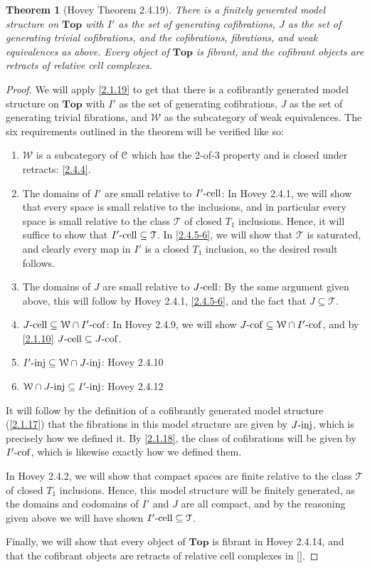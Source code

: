 \documentclass{amsart}
\theoremstyle{plain}
\newtheorem{theorem}{Theorem}[section]
\theoremstyle{definition}
\newcommand{\Top}{\mbf{Top}}
\newcommand{\sseq}{\subseteq}
\newcommand{\0}{\mathbf{0}}
\newcommand{\cC}{\mathcal C}
\newcommand{\cT}{\mathcal T}
\newcommand{\cW}{\mathcal W}
\newcommand{\mbf}[1]{\mathbf{#1}}
\renewcommand{\(}{\left(}
\renewcommand{\)}{\right)}
\def\scr{\EuScript}
\def\cC{\scr{C}}
\newcommand{\inj}{\text-\mathrm{inj}}
\newcommand{\cell}{\text-\mathrm{cell}}
\newcommand{\cof}{\text-\mathrm{cof}}
\begin{document}
\begin{theorem}[Hovey Theorem 2.4.19]\label{2.4.19}
  There is a finitely generated model structure on $\Top$ with $I'$ as the set of generating cofibrations, $J$ as the set of generating trivial cofibrations, and the cofibrations, fibrations, and weak equivalences as above. Every object of $\Top$ is fibrant, and the cofibrant objects are retracts of relative cell complexes.
\end{theorem}
\begin{proof}
  We will apply \autoref{2.1.19} to get that there is a cofibrantly generated model structure on $\Top$ with $I'$ as the set of generating cofibrations, $J$ as the set of generating trivial fibrations, and $\cW$ as the subcategory of weak equivalences. The six requirements outlined in the theorem will be verified like so:
  \begin{enumerate}[label=\arabic*.,noitemsep,topsep=0pt]
    \item $\cW$ is a subcategory of $\cC$ which has the 2-of-3 property and is closed under retracts: \autoref{2.4.4}.
    \item The domains of $I'$ are small relative to $I'\cell$: In {\color{red}Hovey 2.4.1}, we will show that every space is small relative to the inclusions, and in particular every space is small relative to the class $\cT$ of closed $T_1$ inclusions. Hence, it will suffice to show that $I'\cell\sseq\cT$. In \autoref{2.4.5-6}, we will show that $\cT$ is saturated, and clearly every map in $I'$ is a closed $T_1$ inclusion, so the desired result follows.
    \item The domains of $J$ are small relative to $J\cell$: By the same argument given above, this will follow by {\color{red}Hovey 2.4.1}, \autoref{2.4.5-6}, and the fact that $J\sseq\cT$.
    \item $J\cell\sseq\cW\cap I'\cof$: In {\color{red}Hovey 2.4.9}, we will show $J\cof\sseq\cW\cap I'\cof$, and by \autoref{2.1.10} $J\cell\sseq J\cof$.
    \item $I'\inj\sseq\cW\cap J\inj$: {\color{red}Hovey 2.4.10}
    \item $\cW\cap J\inj\sseq I'\inj$: {\color{red}Hovey 2.4.12}
  \end{enumerate}
  It will follow by the definition of a cofibrantly generated model structure (\autoref{2.1.17}) that the fibrations in this model structure are given by $J\inj$, which is precisely how we defined it. By \autoref{2.1.18}, the class of cofibrations will be given by $I'\cof$, which is likewise exactly how we defined them.

  In {\color{red}Hovey 2.4.2}, we will show that compact spaces are finite relative to the class $\cT$ of closed $T_1$ inclusions. Hence, this model structure will be finitely generated, as the domains and codomains of $I'$ and $J$ are all compact, and by the reasoning given above we will have shown $I'\cell\sseq\cT$.
  
  Finally, we will show that every object of $\Top$ is fibrant in {\color{red}Hovey 2.4.14}, and that the cofibrant objects are retracts of relative cell complexes in \autoref{}.
\end{proof}
\end{document}
